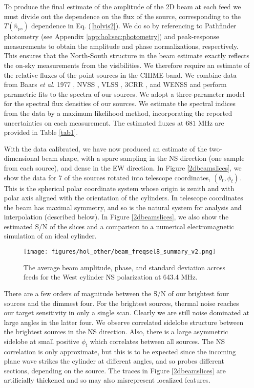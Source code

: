 To produce the final estimate of the amplitude of the 2D beam at each feed we must divide out the dependence on the flux of the source, corresponding to the $T(\hat{n}_{ps})$ dependence in Eq. (\ref{holvis2}). We do so by referencing to Pathfinder photometry (see Appendix \ref{app:hol:sec:photometry}) and peak-response measurements to obtain the amplitude and phase normalizations, respectively. This ensures that the North-South structure in the beam estimate exactly reflects the on-sky measurements from the visibilities. We therefore require an estimate of the relative fluxes of the point sources in the CHIME band. We combine data from Baars {\it et al.} 1977 \citep{baars}, NVSS \citep{NVSS}, VLSS \citep{VLSS}, 3CRR \citep{3CRR}, and WENSS \citep{WENSS} and perform parametric fits to the spectra of our sources. We adopt a three-parameter model for the spectral flux densities of our sources. We estimate the spectral indices from the data by a maximum likelihood method, incorporating the reported uncertainties on each measurement. The estimated fluxes at $681$ MHz are provided in Table \ref{tab1}.

With the data calibrated, we have now produced an estimate of the two-dimensional beam shape, with a spare sampling in the NS direction (one sample from each source), and dense in the EW direction. In Figure \ref{2dbeamslices}, we show the data for 7 of the sources rotated into telescope coordinates, $(\theta_t, \phi_t)$. This is the spherical polar coordinate system whose origin is zenith and with polar axis aligned with the orientation of the cylinders. In telescope coordinates the beam has maximal symmetry, and so is the natural system for analysis and interpolation (described below). In Figure \ref{2dbeamslices}, we also show the estimated S/N of the slices and a comparison to a numerical electromagnetic simulation of an ideal cylinder.

\begin{figure}[h!]
\begin{center}
\texttt{[image: figures/hol\_other/beam\_freqsel8\_summary\_v2.png]}
\caption{The average beam amplitude, phase, and standard deviation across feeds for the West cylinder NS polarization at 643.4 MHz.\label{example}}
\end{center}
\end{figure}

There are a few orders of magnitude between the S/N of our brightest four sources and the dimmest four. For the brightest sources, thermal noise reaches our target sensitivity \citep{mmodes2} in only a single scan. Clearly we are still noise dominated at large angles in the latter four. We observe correlated sidelobe structure between the brightest sources in the NS direction. Also, there is a large asymmetric sidelobe at small positive $\phi_t$ which correlates between all sources. The NS correlation is only approximate, but this is to be expected since the incoming plane wave strikes the cylinder at different angles, and so probes different sections, depending on the source. The traces in Figure \ref{2dbeamslices} are artificially thickened and so may also misrepresent localized features.

